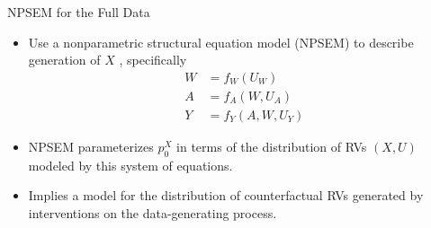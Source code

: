 \documentclass{beamer}
\begin{document}

\begin{frame}[c]{NPSEM for the Full Data}

\begin{center}
\begin{itemize}
  \itemsep10pt
  \item Use a nonparametric structural equation model (NPSEM) to describe
    generation of $X$ \citep{pearl2009causality}, specifically
    \begin{align*}
      W &= f_W(U_W) \\ A &= f_A(W, U_A) \\ Y &= f_Y(A, W, U_Y)
    \end{align*}
  \item NPSEM parameterizes $p_0^X$ in terms of the distribution of RVs $(X, U)$
    modeled by this system of equations.
  \item Implies a model for the distribution of counterfactual RVs generated by
    interventions on the data-generating process.
\end{itemize}
\end{center}


\end{frame}

\end{document}
